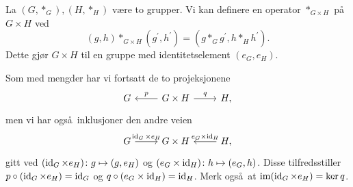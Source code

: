 \begin{definition}
    La $(G, \ast_G), (H, \ast_H)$ være to grupper.
    Vi kan definere en operator $\ast_{G\times H}$
    på $G\times H$ ved
    \[
        (g, h)\ast_{G\times H} (g^\prime, h^\prime)
        = (g \ast_G g^\prime, h \ast_H h^\prime).
    \]
    Dette gjør $G\times H$ til en gruppe med identitetselement $(e_G, e_H)$.
\end{definition}

Som med mengder har vi fortsatt de to projeksjonene
\[\begin{tikzcd}
    G
    \rar[<-]{p}
    &
    G\times H
    \rar{q}
    &
    H,
\end{tikzcd}\]
men vi har også inklusjoner den andre veien
\[\begin{tikzcd}
    G
    \rar{\id_G\times e_H}
    &
    G\times H
    \rar[<-]{e_G\times \id_H}
    &
    H,
\end{tikzcd}\]
gitt ved $(\operatorname{id}_G\times e_H)\colon g\mapsto (g, e_H)$
og $(e_G\times \operatorname{id}_H)\colon h\mapsto (e_G, h)$.
Disse tilfredsstiller $p\circ (\operatorname{id}_G\times e_H) = \operatorname{id}_G$
og $q\circ (e_G\times \operatorname{id}_H) = \operatorname{id}_H$.
Merk også at $\operatorname{im} (\operatorname{id}_G\times e_H) = \ker q$.

